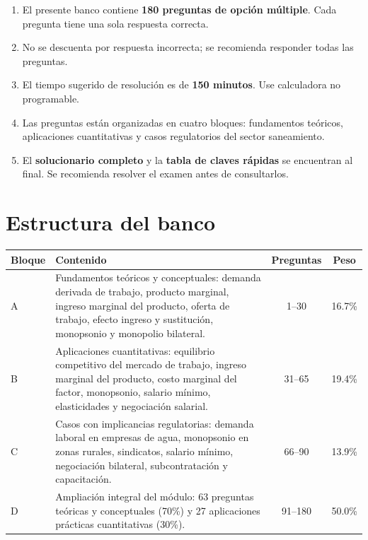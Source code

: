 \documentclass[11pt,a4paper]{article}
\begin{document}
\begin{enumerate}[label=\arabic*.,leftmargin=1.6em,itemsep=3pt]
  \item El presente banco contiene \textbf{180 preguntas de opción múltiple}. Cada pregunta tiene una sola respuesta correcta.
  \item No se descuenta por respuesta incorrecta; se recomienda responder todas las preguntas.
  \item El tiempo sugerido de resolución es de \textbf{150 minutos}. Use calculadora no programable.
  \item Las preguntas están organizadas en cuatro bloques: fundamentos teóricos, aplicaciones cuantitativas y casos regulatorios del sector saneamiento.
  \item El \textbf{solucionario completo} y la \textbf{tabla de claves rápidas} se encuentran al final. Se recomienda resolver el examen antes de consultarlos.
\end{enumerate}

\section*{Estructura del banco}

\begin{center}
\renewcommand{\arraystretch}{1.25}
\begin{tabular}{@{}p{1.4cm}>{\raggedright\arraybackslash}p{7.6cm}cc@{}}
\toprule
\textbf{Bloque} & \textbf{Contenido} & \textbf{Preguntas} & \textbf{Peso} \\
\midrule
A & Fundamentos teóricos y conceptuales: demanda derivada de trabajo, producto marginal, ingreso marginal del producto, oferta de trabajo, efecto ingreso y sustitución, monopsonio y monopolio bilateral. & 1--30 & 16.7\% \\
B & Aplicaciones cuantitativas: equilibrio competitivo del mercado de trabajo, ingreso marginal del producto, costo marginal del factor, monopsonio, salario mínimo, elasticidades y negociación salarial. & 31--65 & 19.4\% \\
C & Casos con implicancias regulatorias: demanda laboral en empresas de agua, monopsonio en zonas rurales, sindicatos, salario mínimo, negociación bilateral, subcontratación y capacitación. & 66--90 & 13.9\% \\
D & Ampliación integral del módulo: 63 preguntas teóricas y conceptuales (70\%) y 27 aplicaciones prácticas cuantitativas (30\%). & 91--180 & 50.0\% \\
\bottomrule
\end{tabular}
\end{center}
\end{document}
